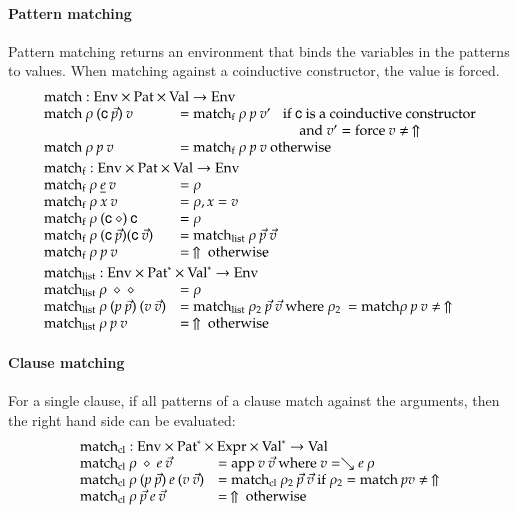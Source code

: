 \paragraph*{Pattern matching}
Pattern matching returns an environment that binds the variables in the patterns to values.
When matching against a coinductive constructor, the value is forced.
\[
\begin{array}{ll}
\multicolumn{2}{l}{\match : \Env \times \Pat \times \Val \ra \Env}\\
\match \: \rho \: (\cc \: \vec{p}) \: v & = \matchf \: \rho \: p \: v' \spc \mbox{if  } \cc  \mbox{ is a coinductive constructor}\\
& \spcx \spcx \spcx \mbox{and } v' = \forc \: v \neq \stuck \\
\match \: \rho \: p \: v & = \matchf \: \rho \: p \: v \mbox{ otherwise}
\vs\\
\multicolumn{2}{l}{\matchf : \Env \times \Pat \times \Val \ra \Env}\\
\matchf \: \rho \: \inacc{e} \: v & = \rho \\
\matchf \: \rho \: x \: v & = \ins{\rho}{x}{v} \\
\matchf \: \rho \: (\cc \: \diamond) \: \cc & = \rho \\
\matchf \: \rho \: (\cc \: \vec{p}) (\cc \: \vec{v}) & = \matchList \: \rho \: \vec{p} \: \vec{v} \\
\matchf \: \rho \: p \: v & = \stuck \mbox{ otherwise}
\vs\\
\multicolumn{2}{l}{\matchList : \Env \times \ves{\Pat} \times \ves{\Val} \ra \Env }\\
\matchList \: \rho \: \diamond \: \diamond & = \rho \\
\matchList \: \rho \: (p \: \vec{p}) \: (v \: \vec{v}) & = \matchList \: \rho_2 \: \vec{p} \: \vec{v} \mbox{ where } \rho_2 \: = \match \rho \: p \: v \neq \stuck \\
\matchList \: \rho \: p \: v & = \stuck \mbox { otherwise } \\
\end{array}
\]

\paragraph*{Clause matching}
For a single clause, if all patterns of a clause match against the arguments, then the right hand side can be evaluated: 
\[
\begin{array}{ll}
\multicolumn{2}{l}{\matchcl : \Env \times \ves{\Pat} \times \Expr \times \ves{\Val} \ra \Val}\\
\matchcl \: \rho \: \diamond \: e \: \vec{v} & = \ap \: v \: \vec{v} \mbox{ where } v = \wh e \: \rho \\
\matchcl \: \rho \: (p \: \vec{p}) \: e \: (v \: \vec{v}) & = \matchcl \: \rho_2 \: \vec{p} \: \vec{v} \mbox{ if } \rho_2 = \match \: p v \neq \stuck \\  
\matchcl \: \rho \: \vec{p}\: e \: \vec{v} & = \stuck \mbox{ otherwise}\\  
\end{array}
\]

